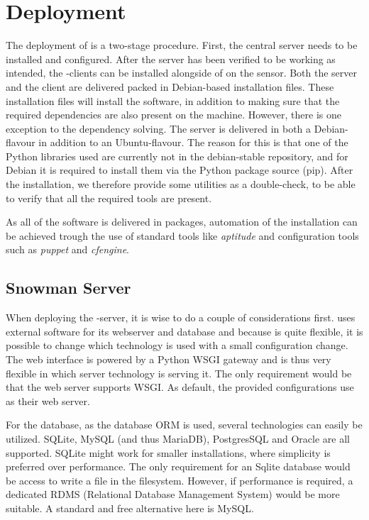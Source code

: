 \section{Deployment}

The deployment of \snowman{} is a two-stage procedure. First, the central server
needs to be installed and configured. After the server has been verified
to be working as intended, the \snowman{}-clients can be installed alongside of
\snort{} on the sensor. Both the server and the client are delivered packed in
Debian-based installation files. These installation files will install the
\snowman{} software, in addition to making sure that the required dependencies
are also present on the machine. However, there is one exception to the
dependency solving. The server is delivered in both a Debian-flavour in addition to an Ubuntu-flavour. The reason
for this is that one of the Python libraries used are currently not in the 
debian-stable repository, and for Debian it is required to install them via the
Python package source (pip). After the installation, we therefore provide some
utilities as a double-check, to be able to verify that all the required tools are present.

As all of the \snowman{} software is delivered in packages, automation of the
installation can be achieved trough the use of standard tools like {\em
aptitude} and configuration tools such as {\em puppet} and {\em cfengine}.

\subsection{Snowman Server}

When deploying the \snowman{}-server, it is wise to do a couple of
considerations first.
\snowman{} uses external software for its webserver and database and because
\snowman{} is quite flexible, it is possible to change which
technology is used with a small configuration change. The web interface is
powered by a Python WSGI \cite{wsgi} gateway and is thus very flexible in which server technology is serving it. The only requirement would be that the
web server supports WSGI. As default, the provided configurations use \apache{}
as their web server.

For the database, as the \django{} database ORM is used, several
technologies can easily be utilized. SQLite, MySQL (and thus MariaDB),
PostgresSQL and Oracle are all supported. SQLite might work for smaller
installations, where simplicity is preferred over performance. The only
requirement for an Sqlite database would be access to write a file in the
filesystem. However, if performance is required, a dedicated RDMS (Relational
Database Management System) would be more suitable. A standard and free
alternative here is MySQL.

